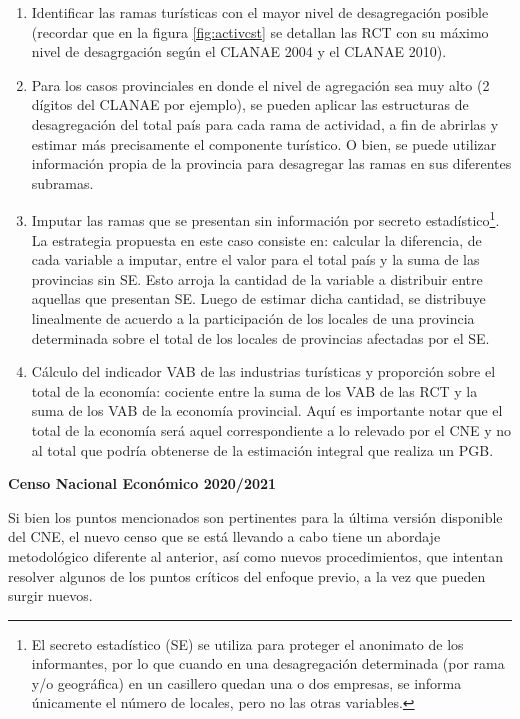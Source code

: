\documentclass[
  openany]{book}
\providecommand{\tightlist}{%
  \setlength{\itemsep}{0pt}\setlength{\parskip}{0pt}}
\begin{document}
\begin{enumerate}
\def\labelenumi{\arabic{enumi}.}
\tightlist
\item
  Identificar las ramas turísticas con el mayor nivel de desagregación posible (recordar que en la figura \ref{fig:activcst} se detallan las RCT con su máximo nivel de desagrgación según el CLANAE 2004 y el CLANAE 2010).
\item
  Para los casos provinciales en donde el nivel de agregación sea muy alto (2 dígitos del CLANAE por ejemplo), se pueden aplicar las estructuras de desagregación del total país para cada rama de actividad, a fin de abrirlas y estimar más precisamente el componente turístico. O bien, se puede utilizar información propia de la provincia para desagregar las ramas en sus diferentes subramas.
\item
  Imputar las ramas que se presentan sin información por secreto estadístico\footnote{El secreto estadístico (SE) se utiliza para proteger el anonimato de los informantes, por lo que cuando en una desagregación determinada (por rama y/o geográfica) en un casillero quedan una o dos empresas, se informa únicamente el número de locales, pero no las otras variables.}. La estrategia propuesta en este caso consiste en: calcular la diferencia, de cada variable a imputar, entre el valor para el total país y la suma de las provincias sin SE. Esto arroja la cantidad de la variable a distribuir entre aquellas que presentan SE. Luego de estimar dicha cantidad, se distribuye linealmente de acuerdo a la participación de los locales de una provincia determinada sobre el total de los locales de provincias afectadas por el SE.
\item
  Cálculo del indicador VAB de las industrias turísticas y proporción sobre el total de la economía: cociente entre la suma de los VAB de las RCT y la suma de los VAB de la economía provincial. Aquí es importante notar que el total de la economía será aquel correspondiente a lo relevado por el CNE y no al total que podría obtenerse de la estimación integral que realiza un PGB.
\end{enumerate}

\textbf{Censo Nacional Económico 2020/2021}

Si bien los puntos mencionados son pertinentes para la última versión disponible del CNE, el nuevo censo que se está llevando a cabo tiene un abordaje metodológico diferente al anterior, así como nuevos procedimientos, que intentan resolver algunos de los puntos críticos del enfoque previo, a la vez que pueden surgir nuevos.
\end{document}
